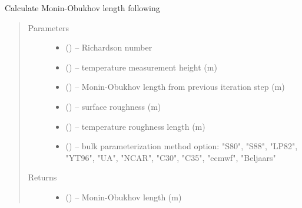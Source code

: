 \documentclass[letterpaper,10pt,english]{sphinxmanual}
\begin{document}

\begin{fulllineitems}
\label{\detokenize{index:flux_subs.get_LRb}}
Calculate Monin-Obukhov length following \cite{era5_2019}

\begin{quote}\begin{description}
\item[{Parameters}] \leavevmode
\begin{itemize}
\item {} 
 (\href{https://docs.python.org/3/library/functions.html\#float}{}) -- Richardson number

\item {} 
 (\href{https://docs.python.org/3/library/functions.html\#float}{}) -- temperature measurement height (m)

\item {} 
(\href{https://docs.python.org/3/library/functions.html\#float}{}) -- Monin-Obukhov length from previous iteration step (m)

\item {} 
(\href{https://docs.python.org/3/library/functions.html\#float}{}) --  surface roughness (m)

\item {} 
(\href{https://docs.python.org/3/library/functions.html\#float}{}) -- temperature roughness length (m)

\item {} 
(\href{https://docs.python.org/3/library/functions.html\#str}{}) -- bulk parameterization method option: "S80", "S88", "LP82", "YT96", "UA", "NCAR", "C30", "C35", "ecmwf", "Beljaars"
\end{itemize}


\item[{Returns}] \leavevmode
\begin{itemize}
\item {} 
(\href{https://docs.python.org/3/library/functions.html\#float}{}) -- Monin-Obukhov length (m)

\end{itemize}
\end{description}\end{quote}

\end{fulllineitems}
\end{document}
